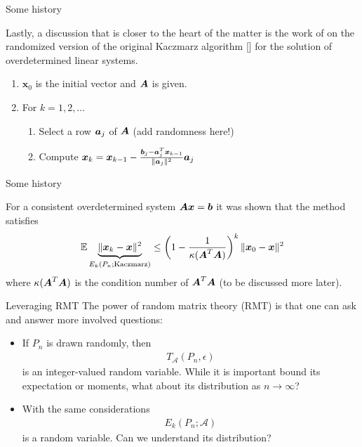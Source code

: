 \documentclass[9pt,aspectratio=169]{beamer}
\begin{document}
\begin{frame}{Some history}

Lastly, a discussion that is closer to the heart of the matter is the work of \cite{Strohmer2009} on the randomized version of the original Kaczmarz algorithm [\cite{kaczmarz1937angenaherte}] for the solution of overdetermined linear systems.


\hspace{2in}
\begin{enumerate}
    \item $\boldsymbol x_0$ is the initial vector and $\AA$ is given.
    \item For $k = 1,2,\ldots$
    \begin{enumerate}
        \item Select a row $\aa_j$ of $\AA$ (add randomness here!)
        \item Compute $\xx_{k} = \xx_{k-1} - \frac{\bb_j - \aa_j^T \xx_{k-1}}{\|\aa_j\|^2} \aa_j $
    \end{enumerate}
\end{enumerate}

\end{frame}

\begin{frame}{Some history}

For a consistent overdetermined system $\AA \xx = \bb$ it was shown that the method satisfies
\begin{align*}
    \mathbb E \underbrace{\| \xx_k - \xx \|^2}_{E_k(P_n;\mathrm{Kaczmarz})} \leq \left( 1 - \frac{1}{\kappa(\AA^T \AA)} \right)^k \|\xx_0 - \xx\|^2
\end{align*}
where $\kappa(\AA^T \AA)$ is the condition number of $\AA^T \AA$ (to be discussed more later).
\end{frame}

\begin{frame}{Leveraging RMT}
    The power of random matrix theory (RMT) is that one can ask and answer more involved questions:
    
    \begin{itemize}
        \item  If $P_n$ is drawn randomly, then
        \begin{align*}
            T_{\mathcal A}(P_n,\epsilon)
        \end{align*}
        is an integer-valued random variable.  While it is important bound its expectation or moments, what about its distribution as $n \to \infty$?
        \item With the same considerations
        \begin{align*}
            E_k(P_n; \mathcal A)
        \end{align*}
        is a random variable. Can we understand its distribution?
    \end{itemize}
\end{frame}
\end{document}
